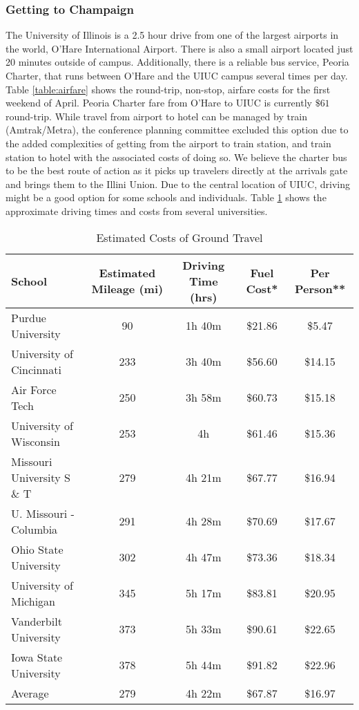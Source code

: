 \subsubsection{Getting to Champaign}
The University of Illinois is a 2.5 hour drive from one of the largest airports in the world, O'Hare International Airport. There is also a small airport located just 20 minutes outside of campus. Additionally, there is a reliable bus service, Peoria Charter, that runs between O'Hare and the UIUC campus several times per day. Table \ref{table:airfare} shows the round-trip, non-stop, airfare costs for the first weekend of April. Peoria Charter fare from O'Hare to UIUC is currently $\$61$ round-trip. While travel from airport to hotel can be managed by train (Amtrak/Metra), the conference planning committee excluded this option due to the added complexities of getting from the airport to train station, and train station to hotel with the associated costs of doing so. We believe the charter bus to be the best route of action as it picks up travelers directly at the arrivals gate and brings them to the Illini Union. Due to the central location of UIUC, driving might be a good option for some schools and individuals. Table \ref{table:ground} shows the approximate driving times and costs from several universities. 

\begin{table}[H]
\caption{Estimated Costs of Ground Travel}
\label{table:ground}
   \begin{tabular}{lcccc}
   \hline\hline
   \textbf{School}&\textbf{Estimated Mileage (mi)}&\textbf{Driving Time (hrs)}&\textbf{Fuel Cost*}&\textbf{Per Person**}\\
   \hline\hline
    Purdue University&90&1h 40m&\$21.86&\$5.47\\
    University of Cincinnati&233& 3h 40m&\$56.60&\$14.15\\
    Air Force Tech &250&3h 58m&\$60.73&\$15.18\\
    University of Wisconsin&253&4h&\$61.46&\$15.36\\
    Missouri University S \& T &279&4h 21m&\$67.77&\$16.94\\
    U. Missouri - Columbia&291&4h 28m&\$70.69&\$17.67\\
    Ohio State University&302&4h 47m&\$73.36&\$18.34\\
    University of Michigan&345&5h 17m&\$83.81&\$20.95\\
    Vanderbilt University&373&5h 33m&\$90.61&\$22.65\\
    Iowa State University&378&5h 44m&\$91.82&\$22.96\\
    \hline
    Average&279&4h 22m&\$67.87&\$16.97

    \end{tabular}
\end{table}


